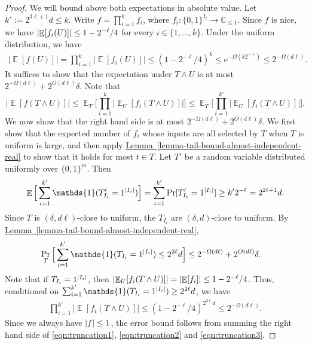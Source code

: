 \documentclass[11pt]{article}
\numberwithin{equation}{section}
\theoremstyle{definition}
\theoremstyle{plain}
\newcommand{\C}{\mathbb C}
\newcommand{\eee}{\mathrm e}
\newcommand{\expref}[2]{\hyperref[#2]{#1~\ref{#2}}}
\newcommand{\zo}{\{0,1\}}
\def\Blocklength{\ell}
\def\1{\mathds{1}}
\DeclarePairedDelimiter{\abs}{\lvert}{\rvert}
\DeclareMathOperator*{\E}{\mathbb{E}}                 %
\begin{document}
  \begin{proof}
    We will bound above both expectations in absolute value.
    Let $k' := 2^{3\Blocklength+1} d \le k$.
    Write $f = \prod_{i=1}^k f_i$, where $f_i\colon \zo^{I_i} \to \C_{\le 1}$.
		Since $f$ is nice, we have $\abs{\E[f_i(U)]} \le 1 - 2^{-\Blocklength} / 4$ for every $i \in \{1, \ldots, k\}$.
   	Under the uniform distribution, we have 
    \begin{align}
      \bigl| \E[f(U)] \bigr|
      = \prod_{i=1}^k \bigl| \E[f_i(U)] \bigr|
			\le (1 - 2^{-\Blocklength} / 4)^k
			\le \eee^{- \Omega(k 2^{-\Blocklength})}
      \le 2^{-\Omega(d\Blocklength)} . \label{eqn:truncation1}
    \end{align}
    It suffices to show that the expectation under $T \wedge U$ is at most $2^{-\Omega(d\Blocklength)} + 2^{O(d\Blocklength)} \delta$.
		Note that 
    \[
      \bigl| \E[f(T \wedge U)] \bigr|
      \le \E_T \Big[ \prod_{i=1}^k \bigl| \E_U[f_i(T \wedge U)] \bigr| \Big]
      \le \E_T \Big[ \prod_{i=1}^{k'} \bigl| \E_U[f_i(T \wedge U)] \bigr| \Big] .
    \]
    We now show that the right hand side is at most $2^{-\Omega(d\Blocklength)} + 2^{O(d\Blocklength)} \delta$.
    We first show that the expected number of $f_i$ whose inputs are all selected by $T$ when $T$ is uniform is large, and then apply \expref{Lemma}{lemma-tail-bound-almost-independent-real} to show that it holds for most $t \in T$.
    Let $T'$ be a random variable distributed uniformly over $\zo^m$.
    Then
    \[
      \E \Big[ \sum_{i=1}^{k'} \1(T'_{I_i} = 1^{\abs{I_i}}) \Big]
      = \sum_{i=1}^{k'} \Pr[T'_{I_i} = 1^{\abs{I_i}}]
      \ge k' 2^{-\Blocklength}
			= 2^{2\Blocklength+1} d .
    \]
    Since $T$ is $(\delta, d\Blocklength)$-close to uniform, the $T_{I_i}$ are $(\delta, d)$-close to uniform.
    By \expref{Lemma}{lemma-tail-bound-almost-independent-real},
    \begin{align}
      \Pr_T \Big[ \sum_{i=1}^{k'} \1(T_{I_i} = 1^{\abs{I_i}}) \le 2^{2\Blocklength}d  \Big]
      &\le 2^{-\Omega(d\Blocklength)} + 2^{O(d\Blocklength)} \delta . \label{eqn:truncation2}
    \end{align}
    Note that if $T_{I_i} = 1^{\abs{I_i}}$, then $\abs{\E_U[ f_i(T \wedge U)]} = \abs{\E[f_i]} \le 1 - 2^{-\Blocklength}/4$.
    Thus, conditioned on $\sum_{i=1}^{k'} \1(T_{I_i} = 1^{\abs{I_i}}) \ge 2^{2\Blocklength} d$, we have
    \begin{align}
      \prod_{i=1}^{k'} \bigl| \E[f_i(T \wedge U)] \bigr|
      \le (1 - 2^{-\Blocklength}/4)^{ 2^{2\Blocklength} d }
      \le 2^{-\Omega(d\Blocklength)} . \label{eqn:truncation3}
    \end{align}
		Since we always have $\abs{f} \le 1$, the error bound follows from summing the right hand side of \eqref{eqn:truncation1}, \eqref{eqn:truncation2} and \eqref{eqn:truncation3}.
  \end{proof}
\end{document}
